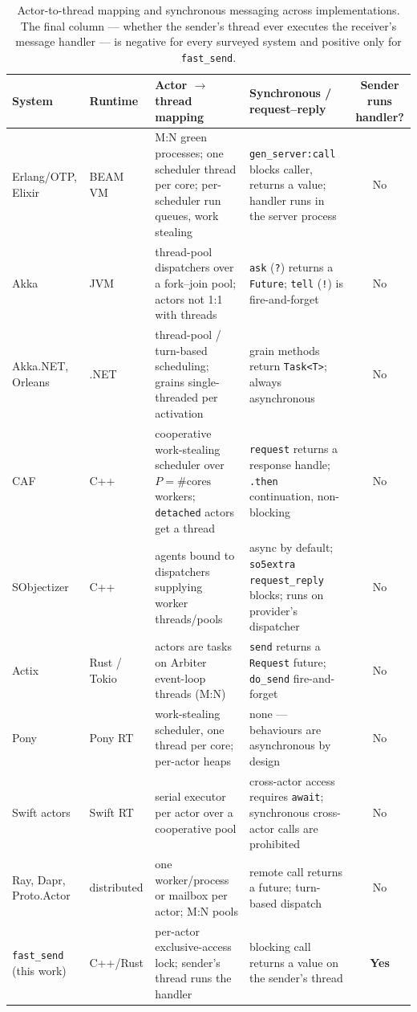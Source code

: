 \documentclass[11pt]{article}
\newcommand{\fs}{\texttt{fast\_send}}
\begin{document}
\begin{table}[t]
\centering
\caption{Actor-to-thread mapping and synchronous messaging across
implementations. The final column --- whether the sender's thread ever executes
the receiver's message handler --- is negative for every surveyed system and
positive only for \fs{}.}
\label{tab:survey}
\footnotesize
\setlength{\tabcolsep}{4pt}
\begin{tabular}{p{2.2cm} p{1.8cm} p{3.1cm} p{3.0cm} c}
\toprule
System & Runtime & Actor $\to$ thread mapping & Synchronous / request--reply & Sender runs handler? \\
\midrule
Erlang/OTP, Elixir & BEAM VM & M:N green processes; one scheduler thread per core; per-scheduler run queues, work stealing & \texttt{gen\_server:call} blocks caller, returns a value; handler runs in the server process & No \\
Akka & JVM & thread-pool dispatchers over a fork--join pool; actors not 1:1 with threads & \texttt{ask} (\texttt{?}) returns a \texttt{Future}; \texttt{tell} (\texttt{!}) is fire-and-forget & No \\
Akka.NET, Orleans & .NET & thread-pool / turn-based scheduling; grains single-threaded per activation & grain methods return \texttt{Task<T>}; always asynchronous & No \\
CAF & C++ & cooperative work-stealing scheduler over $P{=}\#\text{cores}$ workers; \texttt{detached} actors get a thread & \texttt{request} returns a response handle; \texttt{.then} continuation, non-blocking & No \\
SObjectizer & C++ & agents bound to dispatchers supplying worker threads/pools & async by default; \texttt{so5extra} \texttt{request\_reply} blocks; runs on provider's dispatcher & No \\
Actix & Rust / Tokio & actors are tasks on Arbiter event-loop threads (M:N) & \texttt{send} returns a \texttt{Request} future; \texttt{do\_send} fire-and-forget & No \\
Pony & Pony RT & work-stealing scheduler, one thread per core; per-actor heaps & none --- behaviours are asynchronous by design & No \\
Swift actors & Swift RT & serial executor per actor over a cooperative pool & cross-actor access requires \texttt{await}; synchronous cross-actor calls are prohibited & No \\
Ray, Dapr, Proto.Actor & distributed & one worker/process or mailbox per actor; M:N pools & remote call returns a future; turn-based dispatch & No \\
\midrule
\fs{} (this work) & C++/Rust & per-actor exclusive-access lock; sender's thread runs the handler & blocking call returns a value on the sender's thread & \textbf{Yes} \\
\bottomrule
\end{tabular}
\end{table}
\end{document}
